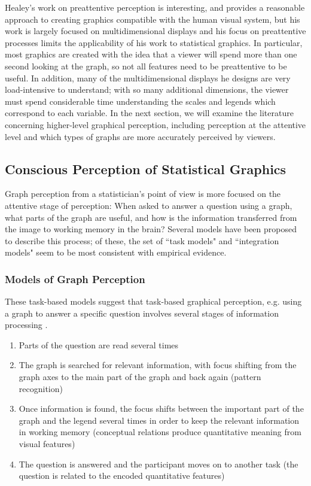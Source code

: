 \documentclass[11pt]{isuthesis}\usepackage[]{graphicx}\usepackage[]{color}
\begin{document}
Healey's work on preattentive perception is interesting, and provides a reasonable approach to creating graphics compatible with the human visual system, but his work is largely focused on multidimensional displays and his focus on preattentive processes limits the applicability of his work to statistical graphics. In particular, most graphics are created with the idea that a viewer will spend more than one second looking at the graph, so not all features need to be preattentive to be useful. In addition, many of the multidimensional displays he designs are very load-intensive to understand; with so many additional dimensions, the viewer must spend considerable time understanding the scales and legends which correspond to each variable. In the next section, we will examine the literature concerning higher-level graphical perception, including perception at the attentive level and which types of graphs are more accurately perceived by viewers. 


\subsection{Conscious Perception of Statistical Graphics}\label{HighLevelGraphics}
Graph perception from a statistician's point of view is more focused on the attentive stage of perception: When asked to answer a question using a graph, what parts of the graph are useful, and how is the information transferred from the image to working memory in the brain? Several models have been proposed to describe this process; of these, the set of ``task models" and ``integration models" seem to be most consistent with empirical evidence. 

\subsubsection{Models of Graph Perception}
These task-based models suggest that task-based graphical perception, e.g. using a graph to answer a specific question involves several stages of information processing \citep{ratwani2008thinking}. 
\begin{enumerate}
\item Parts of the question are read several times
\item The graph is searched for relevant information, with focus shifting from the graph axes to the main part of the graph and back again (pattern recognition)
\item Once information is found, the focus shifts between the important part of the graph and the legend several times in order to keep the relevant information in working memory (conceptual relations produce quantitative meaning from visual features)
\item The question is answered and the participant moves on to another task (the question is related to the encoded quantitative features)
\end{enumerate}
\end{document}
